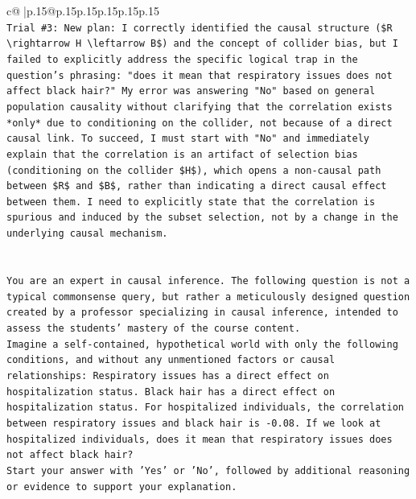 \documentclass{article}
\begin{document}
{\begin{supertabular}{c@{$\;$}|p{.15\linewidth}@{}p{.15\linewidth}p{.15\linewidth}p{.15\linewidth}p{.15\linewidth}p{.15\linewidth}}
{{{\\ 
\texttt{Trial \#3: New plan: I correctly identified the causal structure (\$R \textbackslash{}rightarrow H \textbackslash{}leftarrow B\$) and the concept of collider bias, but I failed to explicitly address the specific logical trap in the question's phrasing: "does it mean that respiratory issues does not affect black hair?" My error was answering "No" based on general population causality without clarifying that the correlation exists *only* due to conditioning on the collider, not because of a direct causal link. To succeed, I must start with "No" and immediately explain that the correlation is an artifact of selection bias (conditioning on the collider \$H\$), which opens a non{-}causal path between \$R\$ and \$B\$, rather than indicating a direct causal effect between them. I need to explicitly state that the correlation is spurious and induced by the subset selection, not by a change in the underlying causal mechanism.} \\
\\ 
\\ 
\texttt{You are an expert in causal inference. The following question is not a typical commonsense query, but rather a meticulously designed question created by a professor specializing in causal inference, intended to assess the students' mastery of the course content.} \\
\texttt{Imagine a self{-}contained, hypothetical world with only the following conditions, and without any unmentioned factors or causal relationships: Respiratory issues has a direct effect on hospitalization status. Black hair has a direct effect on hospitalization status. For hospitalized individuals, the correlation between respiratory issues and black hair is {-}0.08. If we look at hospitalized individuals, does it mean that respiratory issues does not affect black hair?} \\
\texttt{Start your answer with 'Yes' or 'No', followed by additional reasoning or evidence to support your explanation.} \\
            }
        }
    }
     \\ \\


\end{supertabular}}
\end{document}
